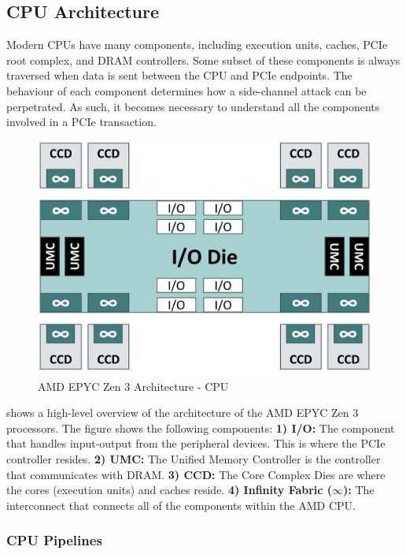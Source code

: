 \subsection{CPU Architecture}
\label{subsec:interconnect-sc-background-cpu-arch}

Modern CPUs have many components, including execution units, caches, PCIe root complex, and DRAM controllers.
Some subset of these components is always traversed when data is sent between the CPU and PCIe endpoints.
The behaviour of each component determines how a side-channel attack can be perpetrated.
As such, it becomes necessary to understand all the components involved in a PCIe transaction.

\begin{figure}[!htb]
    \centering
    \includegraphics[width=\columnwidth]{figures/interconnect-sc/amd_arch/processor.png}
    \caption{AMD EPYC Zen 3 Architecture - CPU}
    \label{fig:amd-cpu}
\end{figure}


 shows a high-level overview of the architecture of the AMD EPYC Zen 3 processors.
The figure shows the following components:
\textbf{1) I/O:} The component that handles input-output from the peripheral devices. This is where the PCIe controller resides.
\textbf{2) UMC:} The Unified Memory Controller is the controller that communicates with DRAM.
\textbf{3) CCD:} The Core Complex Dies are where the cores (execution units) and caches reside.
\textbf{4) Infinity Fabric ($\infty$):} The interconnect that connects all of the components within the AMD CPU.

\subsubsection{CPU Pipelines}
\label{subsubsec:interconnect-sc-background-cpu-arch-pipelines}

